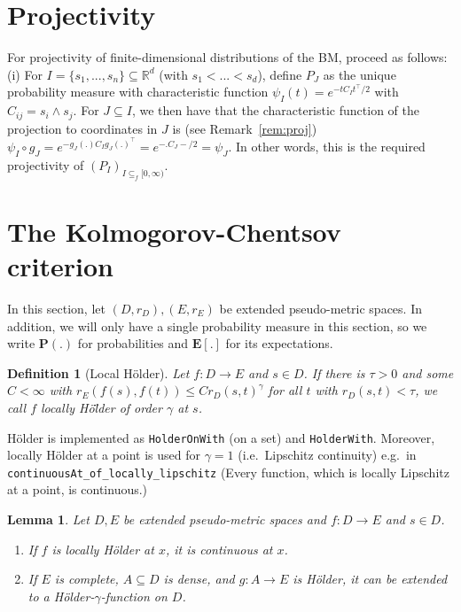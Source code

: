 \documentclass{article}
\newtheorem{lemma}[proposition]{Lemma}
\newtheorem{definition}[proposition]{Definition}
\theoremstyle{definition}
\theoremstyle{step} \newtheorem{step}{Step}
\newcommand{\leanline}[1]{\texttt{#1}}%
\begin{document}
\section{Projectivity}\label{S:proj}
For projectivity of finite-dimensional distributions of the BM,
proceed as follows: (i) For $I = \{s_1,...,s_n\} \subseteq \mathbb
  R^d$ (with $s_1 < ... < s_d$), define $P_J$ as the unique probability
measure with characteristic function $\psi_I(t) = e^{-tC_It^\top/2}$
with $C_{ij} = s_i \wedge s_j$. For $J\subseteq I$, we then have that
the characteristic function of the projection to coordinates in $J$ is
(see Remark~\ref{rem:proj}) $\psi_I \circ g_J = e^{- g_J(.)  C_I
      g_J(.)^\top} = e^{- . C_J -/2} = \psi_J$. In other words, this is
the required projectivity of $(P_I)_{I \subseteq_f [0,\infty)}$.

\section{The Kolmogorov-Chentsov criterion}
In this section, let $(D, r_D), (E, r_E)$ be extended pseudo-metric
spaces. In addition, we will only have a single probability measure in
this section, so we write $\mathbf P(.)$ for probabilities and
$\mathbf E[.]$ for its expectations.

\begin{definition}[Local Hölder]
  Let $f: D\to E$ and $s\in D$. If there is $\tau>0$ and some $C <
    \infty$ with $r_E(f(s), f(t)) \leq C r_D(s,t)^\gamma$ for all $t$
  with $r_D(s,t) < \tau$, we call $f$ \emph{locally Hö\"lder of order
    $\gamma$} at $s$.
\end{definition}

Hölder is implemented as \leanline{HolderOnWith} (on a set) and
\leanline{HolderWith}. Moreover, locally Hölder at a point is used for
$\gamma=1$ (i.e.\ Lipschitz continuity) e.g.\ in
\leanline{continuousAt_of_locally_lipschitz} (Every function, which is
locally Lipschitz at a point, is continuous.)

\begin{lemma}\label{l:holderext}
  Let $D, E$ be extended pseudo-metric spaces and $f: D\to E$ and
  $s\in D$.
  \begin{enumerate}
    \item If $f$ is locally Hölder at $x$, it is continuous at $x$.
    \item If $E$ is complete, $A \subseteq D$ is dense, and $g : A \to
            E$ is Hölder, it can be extended to a Hölder-$\gamma$-function
          on $D$.
  \end{enumerate}
\end{lemma}
\end{document}
